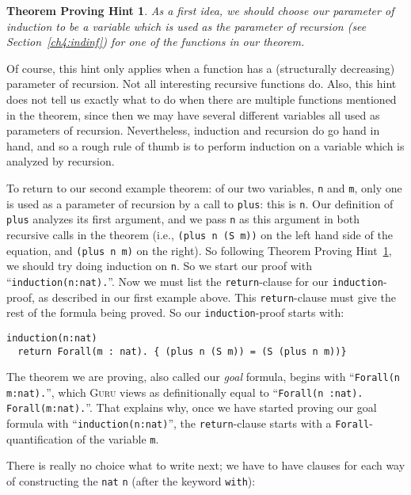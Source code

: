 \documentclass{book}[12pt]
\newcommand{\guru}[0]{\textsc{Guru}\xspace}
\newtheorem{hint}{Theorem Proving Hint}
\begin{document}
\begin{hint}
\label{hint:indrec}
As a first idea, we should choose our parameter of induction to be a
variable which is used as the parameter of recursion (see
Section~\ref{ch4:indinf}) for one of the functions in our theorem. 
\end{hint}

\noindent Of course, this hint only applies when a function has a
(structurally decreasing) parameter of recursion.  Not all interesting
recursive functions do.  Also, this hint does not tell us exactly what
to do when there are multiple functions mentioned in the theorem,
since then we may have several different variables all used as
parameters of recursion.  Nevertheless, induction and recursion do go
hand in hand, and so a rough rule of thumb is to perform induction on
a variable which is analyzed by recursion.

To return to our second example theorem: of our two variables,
\texttt{n} and \texttt{m}, only one is used as a parameter of
recursion by a call to \texttt{plus}: this is \texttt{n}.  Our
definition of \texttt{plus} analyzes its first argument, and we pass
\texttt{n} as this argument in both recursive calls in the theorem
(i.e., \texttt{(plus n (S m))} on the left hand side of the equation,
and \texttt{(plus n m)} on the right).  So following Theorem Proving
Hint~\ref{hint:indrec}, we should try doing induction on \texttt{n}.
So we start our proof with ``\texttt{induction(n:nat).}''.  Now we
must list the \texttt{return}-clause for our \texttt{induction}-proof,
as described in our first example above.  This \texttt{return}-clause
must give the rest of the formula being proved.  So our
\texttt{induction}-proof starts with:

\begin{verbatim}
induction(n:nat) 
  return Forall(m : nat). { (plus n (S m)) = (S (plus n m))}
\end{verbatim}

\noindent The theorem we are proving, also called our \emph{goal}
formula, begins with ``\texttt{Forall(n m:nat).}'', which \guru views
as definitionally equal to ``\texttt{Forall(n
:nat). Forall(m:nat).}''.  That explains why, once we have started
proving our goal formula with ``\texttt{induction(n:nat)}'', the
\texttt{return}-clause starts with a \texttt{Forall}-quantification of
the variable \texttt{m}.

There is really no choice what to write next; we have to have clauses
for each way of constructing the \texttt{nat} \texttt{n} (after the
keyword \texttt{with}):
\end{document}
